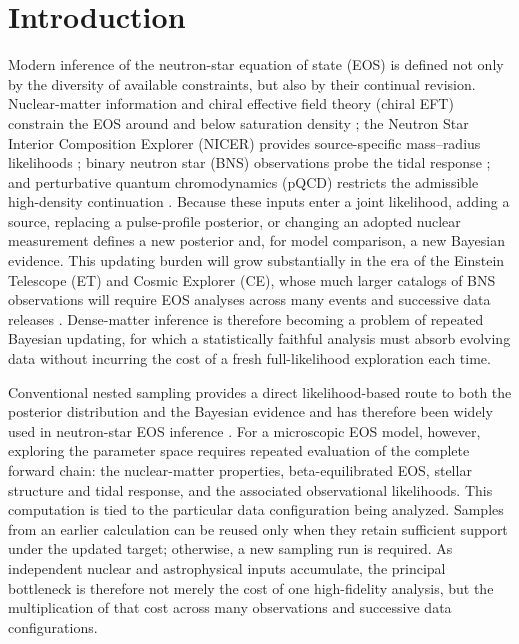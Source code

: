 \documentclass[aps,prd,twocolumn,superscriptaddress,nofootinbib,longbibliography]{revtex4-2}
\begin{document}
\section{Introduction}
\label{sec:intro}

Modern inference of the neutron-star equation of state (EOS)
is defined not only by the diversity of available constraints, but also by
their continual revision. Nuclear-matter information and chiral effective
field theory (chiral EFT) constrain the EOS around and below saturation density
\cite{Malik:2022zol,Thakur:2026dpr}; the Neutron Star Interior Composition
Explorer (NICER) provides source-specific
mass--radius likelihoods
\cite{Miller:2019cac,Riley:2019yda,Dittmann:2024mbo,Choudhury:2024xbk,
Mauviard:2025dmd,Salmi:2024bss,Mauviard:2026gzc}; binary neutron star (BNS)
observations probe the
tidal response \cite{LIGOScientific:2017vwq}; and perturbative quantum
chromodynamics (pQCD) restricts the admissible high-density continuation
\cite{Komoltsev:2021jzg,Gorda:2022jvk}. Because these inputs enter a joint
likelihood, adding a source, replacing a pulse-profile posterior, or changing
an adopted nuclear measurement defines a new posterior and, for model
comparison, a new Bayesian evidence. This updating burden will grow
substantially in the era of the Einstein Telescope (ET) and Cosmic Explorer
(CE), whose much larger catalogs of BNS observations will require EOS
analyses across many events and successive data releases
\cite{Punturo:2010zz,Evans:2021gyd}. Dense-matter inference is therefore
becoming a problem of repeated Bayesian updating, for which a statistically
faithful analysis must absorb evolving data without incurring the cost of a
fresh full-likelihood exploration each time.

Conventional nested sampling provides a direct
likelihood-based route to both the posterior distribution and the Bayesian
evidence and has therefore been widely used in neutron-star EOS inference
\cite{Malik:2022zol,Malik:2022jqc,Buchner:2021cql}. For a microscopic EOS
model, however, exploring the parameter space requires repeated evaluation of
the complete forward chain: the nuclear-matter properties, beta-equilibrated
EOS, stellar structure and tidal response, and the associated observational
likelihoods. This computation is tied to the particular data configuration
being analyzed. Samples from an earlier calculation can be reused only when
they retain sufficient support under the updated target; otherwise, a new
sampling run is required. As independent nuclear and astrophysical inputs
accumulate, the principal bottleneck is therefore not merely the cost of one
high-fidelity analysis, but the multiplication of that cost across many
observations and successive data configurations.
\end{document}
